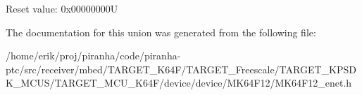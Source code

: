 Reset value\+: 0x00000000U 

The documentation for this union was generated from the following file\+:\begin{DoxyCompactItemize}
\item 
/home/erik/proj/piranha/code/piranha-\/ptc/src/receiver/mbed/\+T\+A\+R\+G\+E\+T\+\_\+\+K64\+F/\+T\+A\+R\+G\+E\+T\+\_\+\+Freescale/\+T\+A\+R\+G\+E\+T\+\_\+\+K\+P\+S\+D\+K\+\_\+\+M\+C\+U\+S/\+T\+A\+R\+G\+E\+T\+\_\+\+M\+C\+U\+\_\+\+K64\+F/device/device/\+M\+K64\+F12/M\+K64\+F12\+\_\+enet.\+h\end{DoxyCompactItemize}
